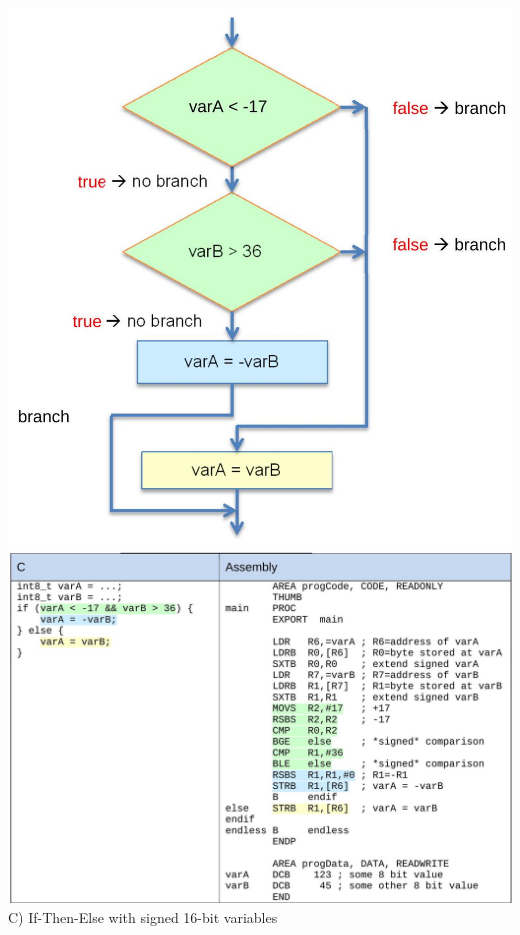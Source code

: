 \documentclass[10pt]{article}
\begin{document}
\includegraphics[max width=\textwidth, center]{2025_01_02_7eee2d56b23c0199f878g-6}\\
\includegraphics[max width=\textwidth, center]{2025_01_02_7eee2d56b23c0199f878g-6(1)}\\
C) If-Then-Else with signed 16-bit variables\\
\end{document}
